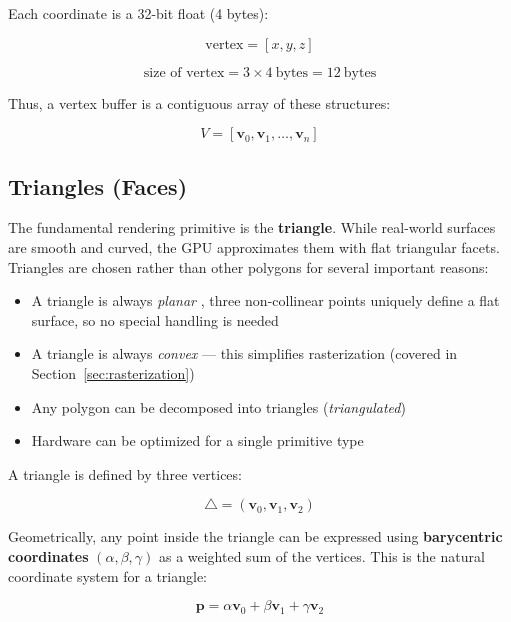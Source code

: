 \documentclass[11pt]{article}
\begin{document}
Each coordinate is a 32-bit float (4 bytes):

\begin{equation}
    \text{vertex} = [x, y, z]
\end{equation}

\begin{equation}
    \text{size of vertex} = 3 \times 4\ \text{bytes} = 12\ \text{bytes}
\end{equation}

Thus, a vertex buffer is a contiguous array of these structures:

\begin{equation}
    V = [\mathbf{v}_0, \mathbf{v}_1, \dots, \mathbf{v}_n]
\end{equation}


\subsection{Triangles (Faces)}

The fundamental rendering primitive is the \textbf{triangle}. While real-world surfaces are smooth and curved, the GPU approximates them with flat triangular facets. Triangles are chosen rather than other polygons for several important reasons:
\begin{itemize}
    \item A triangle is always \emph{planar} , three non-collinear points uniquely define a flat surface, so no special handling is needed
    \item A triangle is always \emph{convex} --- this simplifies rasterization (covered in Section~\ref{sec:rasterization})
    \item Any polygon can be decomposed into triangles (\emph{triangulated})
    \item Hardware can be optimized for a single primitive type
\end{itemize}

A triangle is defined by three vertices:

\begin{equation}
    \triangle = (\mathbf{v}_0, \mathbf{v}_1, \mathbf{v}_2)
\end{equation}

Geometrically, any point inside the triangle can be expressed using \textbf{barycentric coordinates} $(\alpha, \beta, \gamma)$ as a weighted sum of the vertices. This is the natural coordinate system for a triangle:

\begin{equation}
    \mathbf{p} = \alpha \mathbf{v}_0 + \beta \mathbf{v}_1 + \gamma \mathbf{v}_2
\end{equation}
\end{document}
